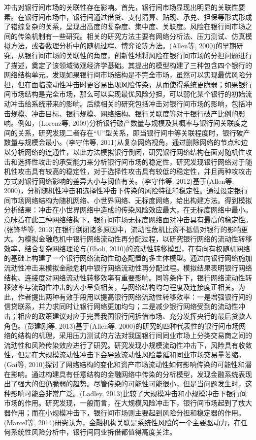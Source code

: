 冲击对银行间市场的关联性存在影响。首先，银行间市场显现出明显的关联性要素。在银行间市场中，银行间通过借贷、支付清算、贴现、承兑、担保等形式形成了错综复杂的关系，呈现出高度的复杂度、集中度、关联度。风险在银行间市场之间的传染机制有一些研究。相关的研究方法主要有网络分析法、压力测试、仿真模拟方法，或者数理分析中的随机过程、博弈论等方法。(Allen等, 2000)的早期研究，从银行间市场的关联性的角度，创新性地将风险在银行间市场的分担问题进行了描述，奠定了该领域微观经济学基础。其提出的模型构建了三种包含四个银行的网络结构单元。发现如果银行间市场结构是不完全市场，虽然可以实现最优风险分担，但在面临流动性冲击时更容易出现风险传染，从而使得系统更脆弱；如果银行间市场结构是完全市场，那么可以实现最优风险分担，可以弱化某个银行的初始流动冲击给系统带来的影响。后续相关的研究包括冲击对银行间市场的影响，包括冲击规模、冲击目标、银行规模、网络结构、银行关联度等对于银行破产比例的影响。例如，(Lorenz等, 2009)分析银行破产数量与规模及其概率与银行间关联度之间的关系，研究发现二者存在“U”型关系，即当银行间中等关联程度时，银行破产数量与规模会最小。(李守伟等, 2011)从复杂网络视角，通过删除网络的节点和边以分析网络的连通性，以此方法模拟银行倒闭，研究银行网络结构在面对随机性攻击和选择性攻击的承受能力来分析银行间市场的稳定性，研究发现银行网络对于随机性攻击具有较高的稳定性，对于选择性攻击具有较低的稳定性，并且两种攻攻击方式对银行网络影响的差异大小与阈值有关。(李守伟等, 2012)基于(Allen等, 2000)，分析随机性冲击和选择性冲击下传染的风险特征和稳定性。通过设定银行间市场网络结构为随机网络、小世界网络、无标度网络，给出构建方法。得到模拟分析结果：冲击在小世界网络中造成的传染风险效应最大，在无标度网络中最小。意味着在此三种网络结构下，银行间市场无标度网络面对冲击具有最高的稳定性。(张锋华等, 2013)在银行倒闭诸多原因中，流动性危机比资不抵债对银行的影响更大。为模拟金融危机中银行网络流动性再分配过程，以研究银行网络的流动性转移效率，结合复杂网络理论与(Eboli, 2010)的流动性转移模型，在有向有权随机网络的基础上构建了一个银行网络流动性动态配置的多主体模型。通过向银行网络施加流动性冲击来模拟金融危机中银行网络流动性再分配过程。模拟结果表明银行网络结构、连接度对网络流动性转移效率有重要影响。同等条件下，银行网络流动性转移效率与流动性冲击的大小呈负相关，与网络结构均匀程度及连接度正相关。为此，作者提出两种有效手段用以提高银行网络流动性转移效率：一是增强银行间的信贷联系，并力求同时让银行网络更加均匀；二是减少银行网络受到的流动性冲击；相应的政策建议对应于完善我国银行间拆借市场、充分发挥央行的最后贷款人角色。(彭建刚等, 2013)基于(Allen等, 2000)的研究的四种代表性的银行间市场网络的结构的机理，采用压力测试的方法对我国银行间同业市场上分类交易商之间的流动性和风险传染效应进行了研究。研究发现小规模流动性冲击下，风险具有收敛性，但是在大规模流动性冲击下会导致流动性风险蔓延和同业市场交易量萎缩。(Gai等, 2010)探讨了网络结构的变化和资产市场流动性如何影响传染的可能性和潜在影响。通过构建具有任意结构的金融网络中传染的分析模型，发现金融系统表现出了强大的但仍脆弱的趋势。尽管传染的可能性可能很小，但是当问题发生时，这种影响可能会非常广泛。(Ladley, 2013)比较了大规模冲击和小规模冲击下银行间市场的作用。研究发现，一般而言，在大规模风险冲击下，银行间市场起到了放大器作用；而在小规模冲击下，银行间市场则主要起到风险分担和稳定器的作用。(Marcel等, 2014)研究认为，金融机构关联是系统性风险的一个主要驱动力，在任何系统性风险分析中，银行间同业拆借都值得高度关注。

